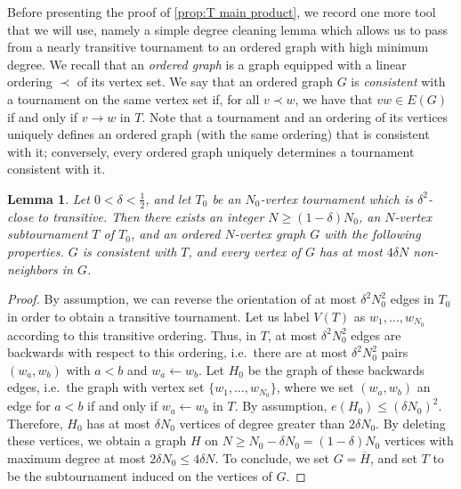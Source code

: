 \documentclass[11pt,reqno]{amsart}
\newtheorem{lemma}[theorem]{Lemma}
\theoremstyle{definition}
\newcommand\1{\mathbf{1}}
\let\leq\leqslant
\let\geq\geqslant
\begin{document}
Before presenting the proof of \cref{prop:T main product}, we record one more tool that we will use, namely a simple degree cleaning lemma which allows us to pass from a nearly transitive tournament to an ordered graph with high minimum degree. We recall that an \emph{ordered graph} is a graph equipped with a linear ordering $\prec$ of its vertex set. We say that an ordered graph $G$ is \emph{consistent} with a tournament on the same vertex set if, for all $v\prec w$, we have that $vw \in E(G)$ if and only if $v \to w$ in $T$. Note that a tournament and an ordering of its vertices uniquely defines an ordered graph (with the same ordering) that is consistent with it; conversely, every ordered graph uniquely determines a tournament consistent with it. 
\begin{lemma}\label{lem:clean degrees}
    Let $0<\delta<\frac 12$, and let $T_0$ be an $N_0$-vertex tournament which is $\delta^2$-close to transitive. Then there exists an integer $N \geq (1-\delta)N_0$, an $N$-vertex subtournament $T$ of $T_0$, and an ordered $N$-vertex graph $G$ with the following properties. $G$ is consistent with $T$, and every vertex of $G$ has at most $4\delta N$ non-neighbors in $G$. 
\end{lemma}
\begin{proof}
    By assumption, we can reverse the orientation of at most $\delta^2 N_0^2$ edges in $T_0$ in order to obtain a transitive tournament. Let us label $V(T)$ as $w_1,\dots,w_{N_0}$ according to this transitive ordering. Thus, in $T$, at most $\delta^2 N_0^2$ edges are backwards with respect to this ordering, i.e.\ there are at most $\delta^2 N_0^2$ pairs $(w_a,w_b)$ with $a<b$ and $w_a \leftarrow w_b$. Let $H_0$ be the graph of these backwards edges, i.e.\ the graph with vertex set $\{w_1,\dots,w_{N_0}\}$, where we set $(w_a,w_b)$ an edge for $a<b$ if and only if $w_a\leftarrow w_b$ in $T$. By assumption, $e(H_0)\leq (\delta N_0)^2$. Therefore, $H_0$ has at most $\delta N_0$ vertices of degree greater than $2\delta N_0$. By deleting these vertices, we obtain a graph $H$ on $N \geq N_0-\delta N_0 =(1-\delta) N_0$ vertices with maximum degree at most $2\delta N_0 \leq 4\delta N$. To conclude, we set $G =\overline H$, and set $T$ to be the subtournament induced on the vertices of $G$.
\end{proof}
\end{document}
